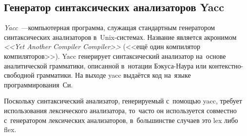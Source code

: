 \subsection{Генератор синтаксических анализаторов Yacc} \label{sub116}

\textit{Yacc}~---компьютерная программа, служащая стандартным генератором синтаксических анализаторов в~Unix-системах. Название является акронимом \textit{<<Yet Another Compiler Compiler>>} (<<ещё один компилятор компиляторов>>). Yacc генерирует синтаксический анализатор на~основе аналитической грамматики, описанной в~нотации Бэкуса-Наура или контекстно-свободной грамматики. На выходе yacc выдаётся код на~языке программирования~Си.

Поскольку синтаксический анализатор, генерируемый с~помощью yacc, требует использования лексического анализатора, то~часто он используется совместно с~генератором лексических анализаторов, в~большинстве случаев это lex либо flex. 

